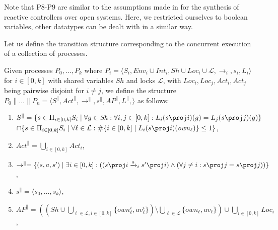 Note that $\text{P8}$-$\text{P9}$ are similar to the assumptions made in \cite{PnueliRosner89} for the synthesis of reactive controllers over open systems. Here, we restricted ourselves to boolean variables, other datatypes can be dealt with in a similar way. 

	Let us define the transition structure corresponding to the concurrent execution of a collection of processes.
\begin{definition}
 Given processes $P_0,\dots,P_k$ 
where $P_i = \langle S_i,\mathit{Env}_i \cup \mathit{Int}_i, \mathit{Sh} \cup \mathit{Loc}_i \cup \mathcal{L},  \rightarrow_i, s_i, L_i \rangle$ for $i \in [0,k]$ with shared variables $\mathit{Sh}$
 and locks $\mathcal{L}$, with $\mathit{Loc}_i, \mathit{Loc}_j, \mathit{Act}_i, \mathit{Act}_j$ being pairwise disjoint for $i \neq j$, we define 
the structure $P_0 \parallel \dots \parallel P_n = \langle S^\parallel, \mathit{Act}^\parallel, \rightarrow^\parallel, s^\parallel , \mathit{AP}^\parallel , L^\parallel, \rangle$  as follows:
\begin{enumerate}	
	\item $S^\parallel = \{s \in \Pi_{i \in [0,k]} S_i \mid \forall g \in \mathit{Sh} : \forall i,j \in [0,k] : L_i(s \proj i)(g) = L_j(s \proj j)(g) \}$\\
			\hspace*{0.8cm}$ \cap \{ s \in \Pi_{i \in [0,k]} S_i \mid \forall \ell \in \mathcal{L} : \#\{i \in [0,k] \mid L_i(s \proj i)(\mathit{own}_\ell)\} \leq 1 \}$,
	\item $\mathit{Act}^\parallel =  \bigcup_{i \in [0,k]} \mathit{Act}_i$,
	\item $\rightarrow^\parallel  = \{ (s,a,s') \mid \exists i \in [0,k] : ((s \proj i \xrightarrow{a}_i s' \proj i) \wedge (\forall j \neq i : s \proj j = s \proj j)) \}$,
	\item $s^\parallel  = \langle s_0, \dots, s_k \rangle$,	
	\item $\mathit{AP}^\parallel = ((\mathit{Sh} \cup \bigcup_{\ell \in \mathcal{L},i\in [0,k]}\{\mathit{own}^i_\ell, av^i_\ell \}) \setminus \bigcup_{\ell \in \mathcal{L}}\{\mathit{own}_\ell, av_\ell\}) \cup \bigcup_{i \in [0,k]}Loc_i$,

\end{enumerate}
\end{definition}
